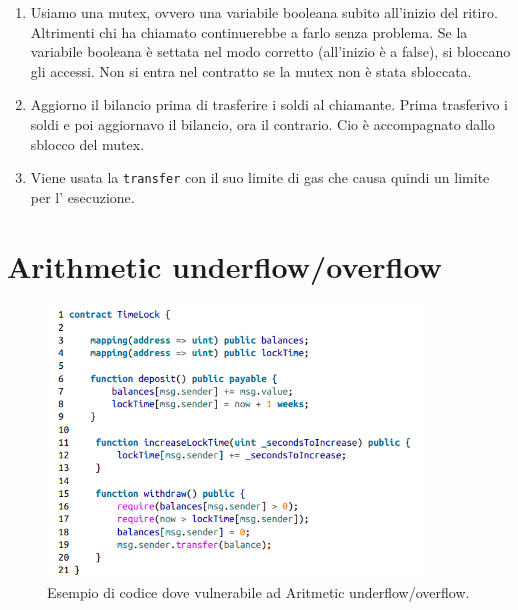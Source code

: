 \begin{enumerate}
      \item Usiamo una mutex, ovvero una variabile booleana subito all'inizio
            del ritiro. Altrimenti chi ha chiamato continuerebbe a farlo senza problema.
            Se la variabile booleana è
            settata nel modo corretto (all'inizio è a false), si bloccano gli accessi.
            Non si entra nel
            contratto se la mutex non è stata sbloccata.
      \item Aggiorno il bilancio prima di trasferire i soldi al chiamante.
            Prima trasferivo i soldi e
            poi aggiornavo il bilancio, ora il contrario.
            Cio è accompagnato dallo sblocco del
            mutex.
      \item Viene usata la \verb|transfer| con il suo limite di gas che causa
            quindi un limite per l'
            esecuzione.
\end{enumerate}

\section{Arithmetic underflow/overflow}

\begin{figure}[H]
      \centering
      \includegraphics[width=10cm, keepaspectratio]{capitoli/ethereum/imgs/aritmetic.png}
      \caption{Esempio di codice dove vulnerabile ad Aritmetic underflow/overflow.}
\end{figure}

